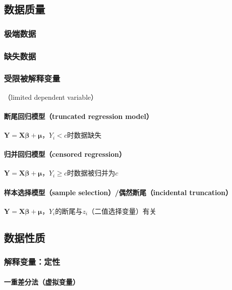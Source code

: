 \documentclass[12pt]{book}
\begin{document}
\subsection{数据质量}


\subsubsection{极端数据}


\subsubsection{缺失数据}


\subsubsection{受限被解释变量}

（limited dependent variable）

\paragraph{断尾回归模型（truncated regression model）}

$\bm{Y}=\bm{X\beta}+\bm{\mu}$，$Y_i<c$时数据缺失

\paragraph{归并回归模型（censored regression）}

$\bm{Y}=\bm{X\beta}+\bm{\mu}$，$Y_i\geq c$时数据被归并为$c$

\paragraph{样本选择模型（sample selection）/偶然断尾（incidental truncation）}

$\bm{Y}=\bm{X\beta}+\bm{\mu}$，$Y_i$的断尾与$z_i$（二值选择变量）有关



\subsection{数据性质}


\subsubsection{解释变量：定性}

\paragraph{一重差分法（虚拟变量）}
\end{document}
